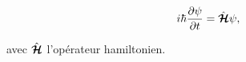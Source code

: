 



\begin{eqnarray}
\quad i \hbar \frac{\partial \psi }{\partial t}  &= \hat{\bm{\mathcal{H}}} \psi,\label{chap.1.rapel.1}
\end{eqnarray}

avec $\hat{\bm{\mathcal{H}}}$ l’opérateur hamiltonien. 



